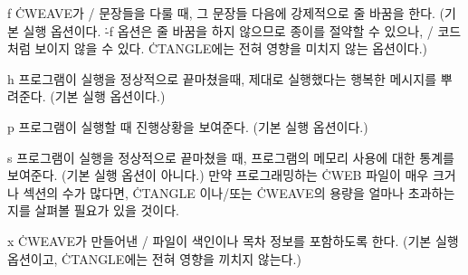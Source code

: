 \option f \.{CWEAVE}가 \CEE/ 문장들을 다룰 때, 그 문장들 다음에
강제적으로 줄 바꿈을 한다. (기본 실행 옵션이다. \.{-f} 옵션은 줄 바꿈을
하지 않으므로 종이를 절약할 수 있으나, \CEE/ 코드처럼 보이지 않을 수
있다. \.{CTANGLE}에는 전혀 영향을 미치지 않는 옵션이다.)

\option h 프로그램이 실행을 정상적으로 끝마쳤을때, 제대로 실행했다는
행복한 메시지를 뿌려준다. (기본 실행 옵션이다.)

\option p 프로그램이 실행할 때 진행상황을 보여준다. (기본 실행 옵션이다.)

\option s 프로그램이 실행을 정상적으로 끝마쳤을 때, 프로그램의 메모리 사용에 대한
통계를 보여준다. (기본 실행 옵션이 아니다.) 만약 프로그래밍하는
\.{CWEB} 파일이 매우 크거나 섹션의 수가 많다면, \.{CTANGLE} 이나/또는
\.{CWEAVE}의 용량을 얼마나 초과하는지를 살펴볼 필요가 있을 것이다.

\option x \.{CWEAVE}가 만들어낸 \TEX/ 파일이 색인이나 목차 정보를
포함하도록 한다. (기본 실행 옵션이고, \.{CTANGLE}에는 전혀 영향을
끼치지 않는다.)

